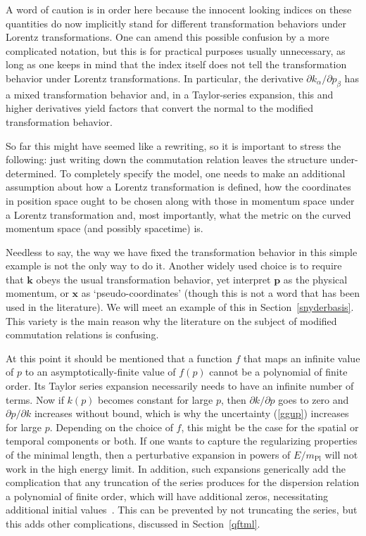 \documentclass{article}
\begin{document}
A word of caution is in order here because the innocent looking indices on these quantities do now implicitly stand for
different transformation behaviors under Lorentz transformations. One can amend this possible confusion by a more complicated notation, but this is for
practical purposes usually unnecessary, as long as one keeps in mind that the index itself does not tell the
transformation behavior under Lorentz transformations. In particular, the derivative $\partial k_\alpha/\partial p_\beta$ has a mixed transformation
behavior and, in a Taylor-series expansion, this and higher derivatives yield factors that convert the normal to
the modified transformation behavior.

So far this might have seemed like a rewriting, so it is important to stress the following: just writing down the
commutation relation leaves the structure under-determined. To completely specify the 
model, one needs to make an additional assumption about how a Lorentz transformation is defined, 
how the coordinates in position space ought to be chosen along with those in momentum space 
under a Lorentz transformation and, most importantly, what the metric on the curved momentum space (and possibly spacetime) is.

Needless to say, the way we have fixed the transformation behavior in this simple example is 
not the only way to do it. Another widely used choice is to require that 
$\mathbf{k}$ obeys the usual transformation behavior, yet interpret $\mathbf{p}$ as the physical momentum, or $\mathbf{x}$ as `pseudo-coordinates'
(though this is not a word that has been used in the literature). We will meet an example of this in Section~\ref{snyderbasis}. 
This variety is the main reason why the literature on the subject of modified commutation relations is
confusing.

At this point it should be mentioned that a function $f$ that maps an infinite value of $p$ to an asymptotically-finite value of $f(p)$ cannot be 
a polynomial of finite order. Its Taylor series expansion necessarily needs to have an infinite number of terms. 
Now if $k(p)$ becomes constant for large $p$, then $\partial k/\partial p$ goes to zero and $\partial p/\partial k$
increases without bound, which is why the uncertainty (\ref{ggup}) increases for large $p$. Depending on the choice
of $f$, this might be the case for the spatial or temporal components or both. If one wants to capture the regularizing
properties of the minimal length, then a perturbative expansion in powers of $E/m_{\mathrm{Pl}}$ will not work in the
high energy limit. In addition, such expansions generically add the complication that any
truncation of the series produces for the dispersion relation a polynomial of finite order, which will have 
additional zeros, necessitating
additional initial values~\cite{Hossenfelder:2007re}. This can be prevented by not truncating the series,
but this adds other complications, discussed in Section~\ref{qftml}.
\end{document}
